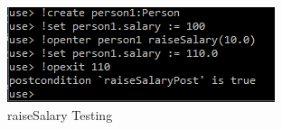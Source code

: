 \documentclass{article}
\begin{document}
	\begin{figure}[h]
		\includegraphics[width=\linewidth]{soil2.PNG}
		\caption{raiseSalary Testing}
		\label{fig:raisesal}
	\end{figure}
\end{document}
